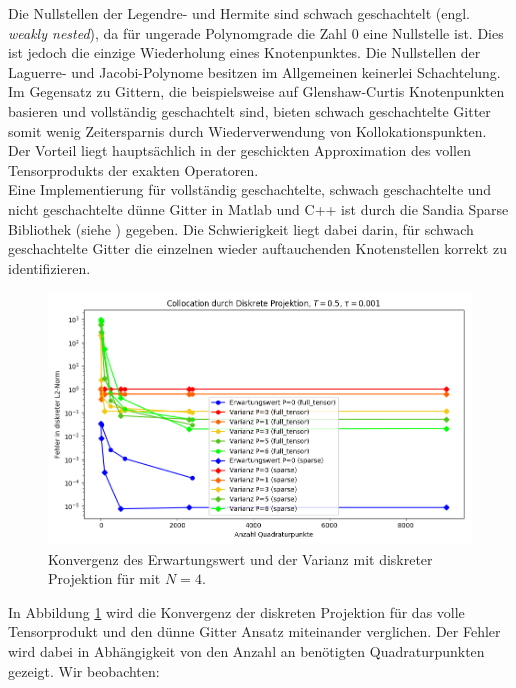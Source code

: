 Die Nullstellen der Legendre- und Hermite sind schwach geschachtelt (engl. \emph{weakly nested}), da für ungerade Polynomgrade die Zahl $0$ eine Nullstelle ist. Dies ist jedoch die einzige Wiederholung eines Knotenpunktes. Die Nullstellen der Laguerre- und Jacobi-Polynome besitzen im Allgemeinen keinerlei Schachtelung.\\
Im Gegensatz zu Gittern, die beispielsweise auf Glenshaw-Curtis Knotenpunkten basieren und vollständig geschachtelt sind, bieten schwach geschachtelte Gitter somit wenig Zeitersparnis durch Wiederverwendung von Kollokationspunkten. Der Vorteil liegt hauptsächlich in der geschickten Approximation des vollen Tensorprodukts der exakten Operatoren.\\
Eine Implementierung für vollständig geschachtelte, schwach geschachtelte und nicht geschachtelte dünne Gitter in Matlab und C++ ist durch die Sandia Sparse Bibliothek (siehe \autocite{Sandia}) gegeben. Die Schwierigkeit liegt dabei darin, für schwach geschachtelte Gitter die einzelnen wieder auftauchenden Knotenstellen korrekt zu identifizieren.
\begin{figure}[!htb]
\includegraphics[width=\textwidth]{Figures/collocation_dp_trial8.png}
\caption{Konvergenz des Erwartungswert und der Varianz mit diskreter Projektion für  mit $N=4$.}
\label{fig:dp_trial8}
\end{figure}
In Abbildung \ref{fig:dp_trial8} wird die Konvergenz der diskreten Projektion für das volle Tensorprodukt und den dünne Gitter Ansatz miteinander verglichen. Der Fehler wird dabei in Abhängigkeit von den Anzahl an benötigten Quadraturpunkten gezeigt. Wir beobachten:
